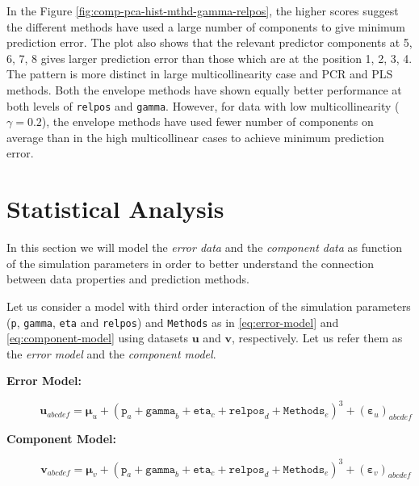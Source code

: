 \documentclass[12pt,3p,authoryear]{elsarticle}
\begin{document}
In the Figure \ref{fig:comp-pca-hist-mthd-gamma-relpos}, the higher
scores suggest the different methods have used a large number of
components to give minimum prediction error. The plot also shows that
the relevant predictor components at 5, 6, 7, 8 gives larger prediction
error than those which are at the position 1, 2, 3, 4. The pattern is
more distinct in large multicollinearity case and PCR and PLS methods.
Both the envelope methods have shown equally better performance at both
levels of \texttt{relpos} and \texttt{gamma}. However, for data with low
multicollinearity (\(\gamma = 0.2\)), the envelope methods have used
fewer number of components on average than in the high multicollinear
cases to achieve minimum prediction error.

\section{Statistical Analysis}\label{statistical-analysis}

In this section we will model the \emph{error data} and the
\emph{component data} as function of the simulation parameters in order
to better understand the connection between data properties and
prediction methods.

Let us consider a model with third order interaction of the simulation
parameters (\texttt{p}, \texttt{gamma}, \texttt{eta} and
\texttt{relpos}) and \texttt{Methods} as in \eqref{eq:error-model} and
\eqref{eq:component-model} using datasets \(\mathbf{u}\) and
\(\mathbf{v}\), respectively. Let us refer them as the \emph{error
model} and the \emph{component model}.

\begin{description}
\item[\textbf{Error Model:}]
\begin{equation}\mathbf{u}_{abcdef} = \boldsymbol{\mu}_u +
  (\texttt{p}_a + \texttt{gamma}_b + \texttt{eta}_c +
\texttt{relpos}_d + \texttt{Methods}_e)^3 +
  \left(\boldsymbol{\varepsilon}_u\right)_{abcdef}
  \label{eq:error-model}
  \end{equation}
\item[\textbf{Component Model:}]
\begin{equation}\mathbf{v}_{abcdef} = \boldsymbol{\mu}_v +
  (\texttt{p}_a + \texttt{gamma}_b + \texttt{eta}_c +
\texttt{relpos}_d + \texttt{Methods}_e)^3 +
  \left(\boldsymbol{\varepsilon}_v\right)_{abcdef}
  \label{eq:component-model}
  \end{equation}
\end{description}
\end{document}
